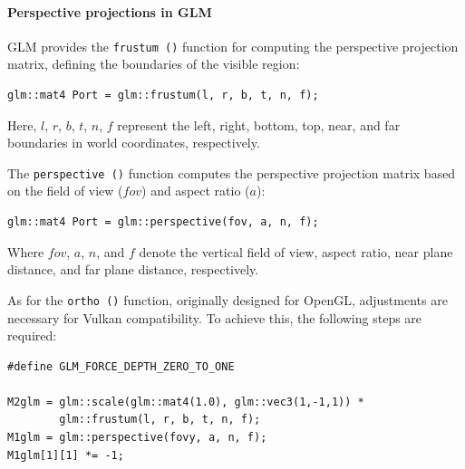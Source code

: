 \paragraph*{Perspective projections in GLM}
GLM provides the \texttt{frustum ()} function for computing the perspective projection matrix, defining the boundaries of the visible region:
\begin{verbatim}
glm::mat4 Port = glm::frustum(l, r, b, t, n, f);
\end{verbatim}
Here, $l$, $r$, $b$, $t$, $n$, $f$ represent the left, right, bottom, top, near, and far boundaries in world coordinates, respectively.

The \texttt{perspective ()} function computes the perspective projection matrix based on the field of view ($fov$) and aspect ratio ($a$):
\begin{verbatim}
glm::mat4 Port = glm::perspective(fov, a, n, f);
\end{verbatim}
Where $fov$, $a$, $n$, and $f$ denote the vertical field of view, aspect ratio, near plane distance, and far plane distance, respectively.

As for the \texttt{ortho ()} function, originally designed for OpenGL, adjustments are necessary for Vulkan compatibility. 
To achieve this, the following steps are required: 
\begin{verbatim}
#define GLM_FORCE_DEPTH_ZERO_TO_ONE

M2glm = glm::scale(glm::mat4(1.0), glm::vec3(1,-1,1)) * 
        glm::frustum(l, r, b, t, n, f);
M1glm = glm::perspective(fovy, a, n, f);
M1glm[1][1] *= -1;
\end{verbatim}

